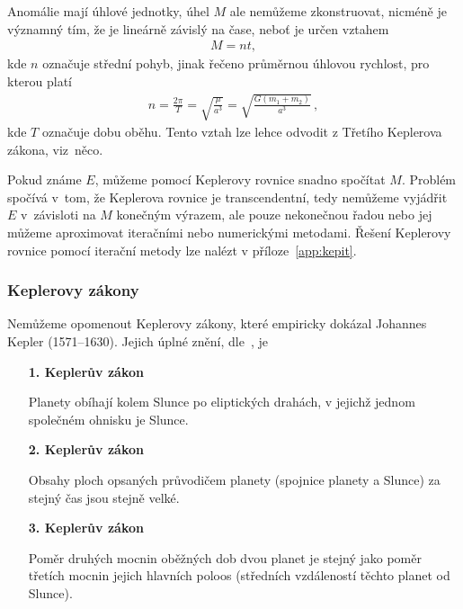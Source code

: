 \documentclass[A4paper, 12pt, oneside]{book}%
\begin{document}
Anomálie mají úhlové jednotky, úhel $M$ ale nemůžeme zkonstruovat, nicméně je významný tím, že je lineárně závislý na čase, neboť je určen vztahem 
\begin{align} \label{eq:M}
	M=nt,
\end{align}
kde $n$ označuje střední pohyb, jinak řečeno průměrnou úhlovou rychlost, pro kterou platí
\begin{align} \label{eq:n}
	n=\frac{2\pi}{T}=\sqrt{\frac{\mu}{a^3}}=\sqrt{\frac{G(m_1+m_2)}{a^3}}\,,
\end{align}
kde $T$ označuje dobu oběhu. Tento vztah lze lehce odvodit z Třetího Keplerova zákona, viz~něco.

Pokud známe $E$, můžeme pomocí Keplerovy rovnice snadno spočítat $M$. Problém spočívá v~tom, že Keplerova rovnice je transcendentní, tedy nemůžeme vyjádřit $E$ v~závisloti na $M$ konečným výrazem, ale pouze nekonečnou řadou nebo jej můžeme aproximovat iteračními nebo numerickými metodami. Řešení Keplerovy rovnice pomocí iterační metody lze nalézt v příloze~\ref{app:kepit}.

\subsubsection{Keplerovy zákony}

Nemůžeme opomenout Keplerovy zákony, které empiricky dokázal Johannes Kepler (1571--1630). Jejich úplné znění, dle~\cite{wiki:kepzak}, je 
\begin{enumerate}[wide]
	\item[\textbf{1. Keplerův zákon}] \ 

Planety obíhají kolem Slunce po eliptických drahách, v jejichž jednom společném ohnisku je Slunce.
	\item[\textbf{2. Keplerův zákon}] \ 

Obsahy ploch opsaných průvodičem planety (spojnice planety a Slunce) za stejný čas jsou stejně velké.
	\item[\textbf{3. Keplerův zákon}] \ 

Poměr druhých mocnin oběžných dob dvou planet je stejný jako poměr třetích mocnin jejich hlavních poloos (středních vzdáleností těchto planet od Slunce).
\end{enumerate}
\end{document}
